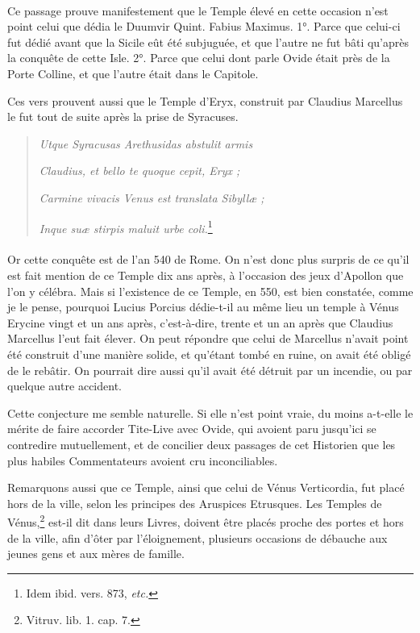 \documentclass[a4paper, 18pt, oneside]{article}
\begin{document}
\paragraph{}
Ce passage prouve manifestement que le Temple élevé en cette occasion n'est point celui que dédia le Duumvir Quint. Fabius Maximus. 1°. Parce que celui-ci fut dédié avant que la Sicile eût été subjuguée, et que l'autre ne fut bâti qu'après la conquête de cette Isle. 2°. Parce que celui dont parle Ovide était près de la Porte Colline, et que l'autre était dans le Capitole.

Ces vers prouvent aussi que le Temple d'Eryx, construit par Claudius Marcellus le fut tout de suite après la prise de Syracuses.
\begin{quotation}
\emph{Utque Syracusas Arethusidas abstulit armis}

\hspace*{5mm}\emph{Claudius, et bello te quoque cepit, Eryx ;}

\emph{Carmine vivacis Venus est translata Sibyllæ ;}

\hspace*{5mm}\emph{Inque suæ stirpis maluit urbe coli.}\footnote{Idem ibid. vers. 873, \emph{etc.}}
\end{quotation}
\paragraph{}
Or cette conquête est de l'an 540 de Rome. On n'est donc plus surpris de ce qu'il est fait mention de ce Temple dix ans après, à l'occasion des jeux d'Apollon que l'on y célébra. Mais si l'existence de ce Temple, en 550, est bien constatée, comme je le pense, pourquoi Lucius Porcius dédie-t-il au même lieu un temple à Vénus Erycine vingt et un ans après, c'est-à-dire, trente et un an après que Claudius Marcellus l'eut fait élever. On peut répondre que celui de Marcellus n'avait point été construit d'une manière solide, et qu'étant tombé en ruine, on avait été obligé de le rebâtir. On pourrait dire aussi qu'il avait été détruit par un incendie, ou par quelque autre accident.

Cette conjecture me semble naturelle. Si elle n'est point vraie, du moins a-t-elle le mérite de faire accorder Tite-Live avec Ovide, qui avoient paru jusqu'ici se contredire mutuellement, et de concilier deux passages de cet Historien que les plus habiles Commentateurs avoient cru inconciliables.

Remarquons aussi que ce Temple, ainsi que celui de Vénus Verticordia, fut placé hors de la ville, selon les principes des Aruspices Etrusques. Les Temples de Vénus,\footnote{Vitruv. lib. 1. cap. 7.} est-il dit dans leurs Livres, doivent être placés proche des portes et hors de la ville, afin d'ôter par l'éloignement, plusieurs occasions de débauche aux jeunes gens et aux mères de famille.
\end{document}
